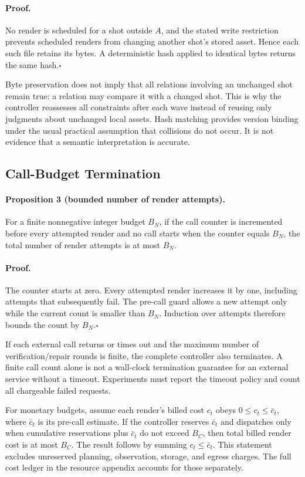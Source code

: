 \paragraph{Proof.}
No render is scheduled for a shot outside $A$, and the stated write
restriction prevents scheduled renders from changing another shot's stored
asset. Hence each such file retains its bytes. A deterministic hash applied
to identical bytes returns the same hash.\hfill$\square$

Byte preservation does not imply that all relations involving an unchanged
shot remain true: a relation may compare it with a changed shot. This is
why the controller reassesses all constraints after each wave instead of
reusing only judgments about unchanged local assets. Hash matching provides
version binding under the usual practical assumption that collisions do not
occur. It is not evidence that a semantic interpretation is accurate.

\subsection{Call-Budget Termination}

\paragraph{Proposition 3 (bounded number of render attempts).}
For a finite nonnegative integer budget $B_N$, if the call counter is
incremented before every attempted render and no call starts when the counter
equals $B_N$, the total number of render attempts is at most $B_N$.

\paragraph{Proof.}
The counter starts at zero. Every attempted render increases it by one,
including attempts that subsequently fail. The pre-call guard allows a new
attempt only while the current count is smaller than $B_N$. Induction over
attempts therefore bounds the count by $B_N$.\hfill$\square$

If each external call returns or times out and the maximum number of
verification/repair rounds is finite, the complete controller also
terminates. A finite call count alone is not a wall-clock termination
guarantee for an external service without a timeout. Experiments must report
the timeout policy and count all chargeable failed requests.

For monetary budgets, assume each render's billed cost $c_t$ obeys
$0\leq c_t\leq\bar c_t$, where $\bar c_t$ is its pre-call estimate.
If the controller reserves $\bar c_t$ and dispatches only when cumulative
reservations plus $\bar c_t$ do not exceed $B_C$, then total billed render
cost is at most $B_C$. The result follows by summing
$c_t\leq\bar c_t$. This statement excludes unreserved planning, observation,
storage, and egress charges. The full cost ledger in the resource appendix
accounts for those separately.

